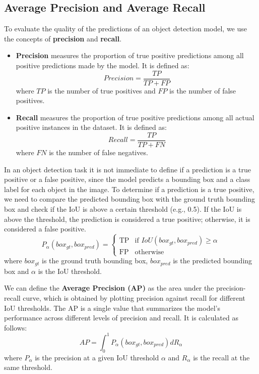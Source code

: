 \subsection*{Average Precision and Average Recall}
To evaluate the quality of the predictions of an object detection model, we use the concepts of \textbf{precision} and \textbf{recall}.
\begin{itemize}
    \item \textbf{Precision} measures the proportion of true positive predictions among all positive predictions made by the model. It is defined as:
    \begin{equation}
        Precision = \frac{TP}{TP + FP}
    \end{equation}
    where \( TP \) is the number of true positives and \( FP \) is the number of false positives.
    
    \item \textbf{Recall} measures the proportion of true positive predictions among all actual positive instances in the dataset. It is defined as:
    \begin{equation}
        Recall = \frac{TP}{TP + FN}
    \end{equation}
    where \( FN \) is the number of false negatives.
\end{itemize}

In an object detection task it is not immediate to define if a prediction is a true positive or a false positive, since the model predicts a bounding box and a class label for each object in the image. To determine if a prediction is a true positive, we need to compare the predicted bounding box with the ground truth bounding box and check if the IoU is above a certain threshold (e.g., 0.5). If the IoU is above the threshold, the prediction is considered a true positive; otherwise, it is considered a false positive.
\begin{equation}
    P_{\alpha}(box_{gt}, box_{pred}) =
    \begin{cases}
        \text{TP} & \text{if } IoU(box_{gt}, box_{pred}) \geq \alpha \\
        \text{FP} & \text{otherwise}
    \end{cases}
\end{equation}
where \( box_{gt} \) is the ground truth bounding box, \( box_{pred} \) is the predicted bounding box and \( \alpha \) is the IoU threshold.

We can define the \textbf{Average Precision (AP)} as the area under the precision-recall curve, which is obtained by plotting precision against recall for different IoU thresholds. The AP is a single value that summarizes the model's performance across different levels of precision and recall. It is calculated as follows:
\begin{equation}
    AP = \int_{0}^{1} P_{\alpha}(box_{gt}, box_{pred}) dR_{\alpha}
\end{equation}
where \( P_{\alpha} \) is the precision at a given IoU threshold \( \alpha \) and \( R_{\alpha} \) is the recall at the same threshold.


